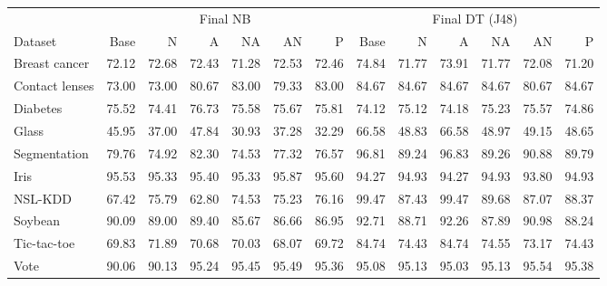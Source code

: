 \begin{tabular}{lrrrrrrrrrrrr}
\toprule
 & \multicolumn{6}{c}{Final NB} & \multicolumn{6}{c}{Final DT (J48)} \\
\cmidrule(lr){2-7}\cmidrule(lr){8-13}
Dataset & Base & N & A & NA & AN & P & Base & N & A & NA & AN & P \\
\midrule
Breast cancer & 72.12 & 72.68 & 72.43 & 71.28 & 72.53 & 72.46 & 74.84 & 71.77 & 73.91 & 71.77 & 72.08 & 71.20 \\
Contact lenses & 73.00 & 73.00 & 80.67 & 83.00 & 79.33 & 83.00 & 84.67 & 84.67 & 84.67 & 84.67 & 80.67 & 84.67 \\
Diabetes & 75.52 & 74.41 & 76.73 & 75.58 & 75.67 & 75.81 & 74.12 & 75.12 & 74.18 & 75.23 & 75.57 & 74.86 \\
Glass & 45.95 & 37.00 & 47.84 & 30.93 & 37.28 & 32.29 & 66.58 & 48.83 & 66.58 & 48.97 & 49.15 & 48.65 \\
Segmentation & 79.76 & 74.92 & 82.30 & 74.53 & 77.32 & 76.57 & 96.81 & 89.24 & 96.83 & 89.26 & 90.88 & 89.79 \\
Iris & 95.53 & 95.33 & 95.40 & 95.33 & 95.87 & 95.60 & 94.27 & 94.93 & 94.27 & 94.93 & 93.80 & 94.93 \\
NSL-KDD & 67.42 & 75.79 & 62.80 & 74.53 & 75.23 & 76.16 & 99.47 & 87.43 & 99.47 & 89.68 & 87.07 & 88.37 \\
Soybean & 90.09 & 89.00 & 89.40 & 85.67 & 86.66 & 86.95 & 92.71 & 88.71 & 92.26 & 87.89 & 90.98 & 88.24 \\
Tic-tac-toe & 69.83 & 71.89 & 70.68 & 70.03 & 68.07 & 69.72 & 84.74 & 74.43 & 84.74 & 74.55 & 73.17 & 74.43 \\
Vote & 90.06 & 90.13 & 95.24 & 95.45 & 95.49 & 95.36 & 95.08 & 95.13 & 95.03 & 95.13 & 95.54 & 95.38 \\
\bottomrule
\end{tabular}
